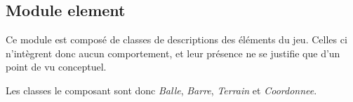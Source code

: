 \subsection{Module element}
\label{sub:Module element}
  \par Ce module est composé de classes de descriptions des éléments du jeu.
  Celles ci n'intègrent donc aucun comportement, et leur présence ne se justifie que d'un point de vu conceptuel.
  \par Les classes le composant sont donc \textit{Balle}, \textit{Barre}, \textit{Terrain} et \textit{Coordonnee}.
